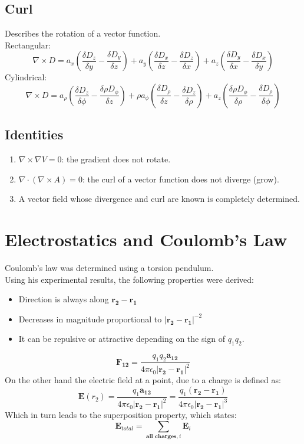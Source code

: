 \documentclass[nobib]{tufte-handout}
\begin{document}
\subsection{Curl}
Describes the rotation of a vector function.\\
Rectangular:
\begin{equation*}
    \nabla \times D = a_x\left(\frac{\delta D_z}{\delta y} - \frac{\delta D_y}{\delta z}\right)+ a_y\left(\frac{\delta D_x}{\delta z} - \frac{\delta D_z}{\delta x}\right)+ a_z\left(\frac{\delta D_y}{\delta x} - \frac{\delta D_x}{\delta y}\right)
\end{equation*}
Cylindrical:
\begin{equation*}
    \nabla \times D = a_\rho\left(\frac{\delta D_z}{\delta \phi} - \frac{\delta \rho D_\phi}{\delta z}\right)+ \rho a_\phi\left(\frac{\delta D_\rho}{\delta z} - \frac{\delta D_z}{\delta \rho}\right)+ a_z \left(\frac{\delta \rho D_\phi}{\delta \rho} - \frac{\delta D_\rho}{\delta \phi}\right)
\end{equation*}
\subsection{Identities}
\begin{enumerate}
    \item $\nabla \times \nabla V = 0$: the gradient does not rotate.
    \item $\nabla \cdot (\nabla \times A) = 0$: the curl of a vector function does not diverge (grow).
    \item A vector field whose divergence and curl are known is completely determined.
\end{enumerate}
\section{Electrostatics and Coulomb's Law}
Coulomb's law was determined using a torsion pendulum.\\
Using his experimental results, the following properties were derived:
\begin{itemize}
    \item Direction is always along $\mathbf{r_2-r_1}$
    \item Decreases in magnitude proportional to $|\mathbf{r_2-r_1}|^{-2}$
    \item It can be repulsive or attractive depending on the sign of $q_1q_2$.
\end{itemize}
\begin{equation*}
    \mathbf{F_{12}} = \frac{q_1 q_2 \mathbf{a_{12}}}{4 \pi  \epsilon_0 |\mathbf{r_2-r_1}|^2}
\end{equation*}
On the other hand the electric field at a point, due to a charge is defined as:
\begin{equation*}
    \mathbf{E}(r_2) = \frac{q_1\mathbf{a_{12}}}{4 \pi \epsilon_0 |\mathbf{r_2-r_1}|^2} = \frac{q_1(\mathbf{r_2-r_1})}{4 \pi \epsilon_0 |\mathbf{r_2-r_1}|^3} 
\end{equation*}
Which in turn leads to the superposition property, which states:
\begin{equation*}
    \mathbf{E_{\mathit{total}} = \sum_{\text{all charges},\mathit{i}}E_\mathit{i}}
\end{equation*}
\end{document}
